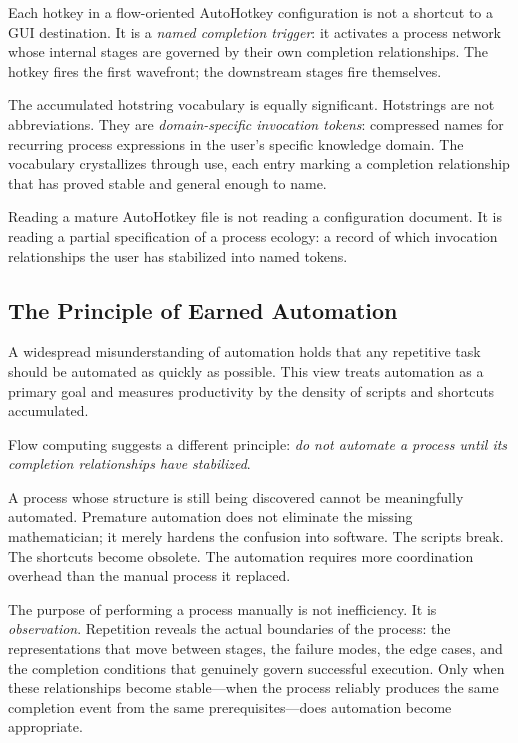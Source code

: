 \documentclass[12pt, a4paper]{article}
\begin{document}
Each hotkey in a flow-oriented AutoHotkey configuration is not a
shortcut to a GUI destination. It is a \emph{named completion trigger}:
it activates a process network whose internal stages are governed by
their own completion relationships. The hotkey fires the first
wavefront; the downstream stages fire themselves.

The accumulated hotstring vocabulary is equally significant. Hotstrings
are not abbreviations. They are \emph{domain-specific invocation tokens}:
compressed names for recurring process expressions in the user's
specific knowledge domain. The vocabulary crystallizes through use,
each entry marking a completion relationship that has proved stable
and general enough to name.

Reading a mature AutoHotkey file is not reading a configuration
document. It is reading a partial specification of a process ecology:
a record of which invocation relationships the user has stabilized
into named tokens.

\subsection{The Principle of Earned Automation}

A widespread misunderstanding of automation holds that any repetitive
task should be automated as quickly as possible. This view treats
automation as a primary goal and measures productivity by the density
of scripts and shortcuts accumulated.

Flow computing suggests a different principle: \emph{do not automate
a process until its completion relationships have stabilized}.

A process whose structure is still being discovered cannot be
meaningfully automated. Premature automation does not eliminate the
missing mathematician; it merely hardens the confusion into software.
The scripts break. The shortcuts become obsolete. The automation
requires more coordination overhead than the manual process it
replaced.

The purpose of performing a process manually is not inefficiency.
It is \emph{observation}. Repetition reveals the actual boundaries
of the process: the representations that move between stages, the
failure modes, the edge cases, and the completion conditions that
genuinely govern successful execution. Only when these relationships
become stable---when the process reliably produces the same
completion event from the same prerequisites---does automation
become appropriate.
\end{document}
